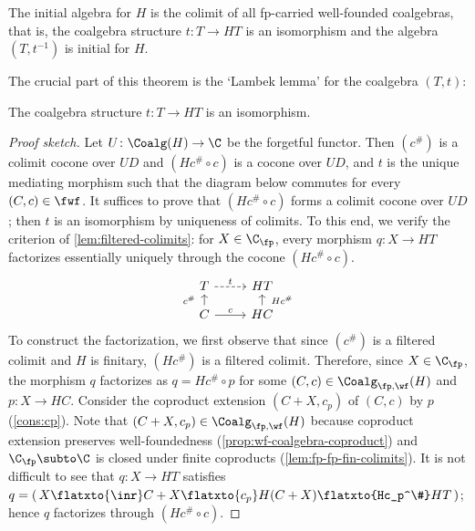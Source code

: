 \documentclass[a4paper,UKenglish, autoref, numberwithinsect, final]{lipics-v2021}
\numberwithin{equation}{section}
\newcommand{\injmono}{\ensuremath{\overset{\smash{\raisebox{-1pt}{\ensuremath{\scriptstyle+}}}}{\rightarrowtail}}}%
\newcommand{\hpresint}{\ensuremath{H\cap}\xspace}
\theoremstyle{plain}
\theoremstyle{definition}
\begin{document}
\begin{theorem}[First Initial Algebra Theorem,\,\smash{\injmono},\,\hpresint]\label{thm:wf-initial-algebra}
The initial algebra for $H$ is the colimit of all fp-carried well-founded coalgebras, that is, the coalgebra structure $t\colon T\to HT$ is an isomorphism and the algebra $(T,t^{-1})$ is initial for $H$.
\end{theorem}

The crucial part of this theorem is the `Lambek lemma' for the coalgebra $(T,t)$:
\begin{lemma}[\smash{\injmono}, \hpresint]\label{lem:t-iso-wf}
The coalgebra structure $t\colon T\to HT$ is an isomorphism.
\end{lemma}

\begin{proof}[Proof sketch]
Let $U\colon \Coalg(H)\to \C$ be the forgetful functor. Then $(c^\#)$ is a colimit cocone over $UD$ and $(Hc^\#\circ c)$ is a cocone over $UD$, and $t$ is the unique mediating morphism such that the diagram below commutes for every $(C,c)\in \fwf$. It suffices to prove that
%
%
  $(Hc^\#\circ c)$ forms a colimit cocone over $UD$; then $t$ is an isomorphism by uniqueness of colimits. To this end, we verify the criterion of \autoref{lem:filtered-colimits}: for $X\in \C_\fp$, every morphism $q\colon X \to HT$ factorizes essentially uniquely through the cocone $(Hc^\# \circ c)$.
%
%
%
\[  
\begin{tikzcd}[row sep=3mm,outer sep=0pt]
T \ar[dashed]{r}{t} & HT \\
C \ar{u}[outer sep=5pt]{c^\#} \ar{r}{c} & HC \ar{u}[swap,outer sep=5pt]{Hc^\#}
\end{tikzcd}
\]
%
%
To construct the factorization, we first observe that since $(c^\#)$ is a filtered colimit and $H$ is finitary, $(Hc^\#)$ is a filtered colimit. Therefore, since $X\in \C_\fp$, the morphism $q$ factorizes as $q=Hc^\# \circ p$ for some $(C,c)\in \Coalg_{\fp,\wf}(H)$ and $p\colon X\to HC$. Consider the coproduct extension $(C+X,c_p)$ of $(C,c)$ by $p$ (\autoref{cons:cp}). Note that $(C+X,c_p)\in \Coalg_{\fp,\wf}(H)$ because coproduct extension preserves well-foundedness (\autoref{prop:wf-coalgebra-coproduct}) and $\C_\fp\subto \C$ is closed under finite coproducts (\autoref{lem:fp-fp-fin-colimits}). It is not difficult to see that $q\colon X\to HT$ satisfies $q=(\,X \flatxto{\inr} C+X \flatxto{c_p}  H(C+X)\flatxto{Hc_p^\#}  HT\,)$; hence $q$ factorizes through $(Hc^\# \circ c)$.
\end{proof}
\end{document}
